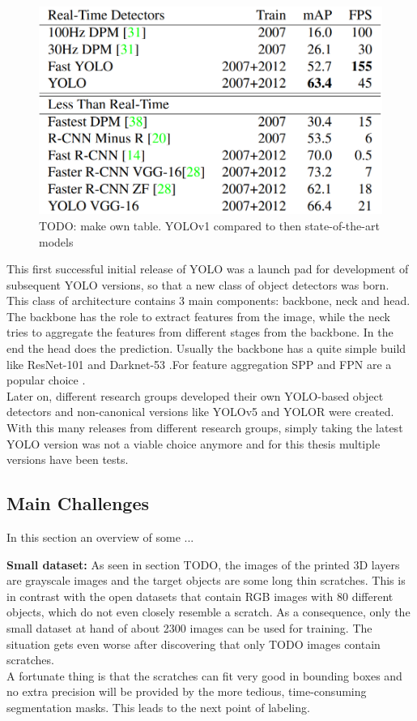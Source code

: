 \begin{figure}[!h]
  \centering
  \includegraphics[width=0.75\linewidth]{images/yolo_images/compare_yolov1}
  \caption{TODO: make own table. YOLOv1 compared to then state-of-the-art models \cite{yolov1_paper}}
\end{figure}


This first successful initial release of YOLO was a launch pad for development of subsequent YOLO versions, so that a new class of object detectors was born. This class of architecture contains 3 main components: backbone, neck and head.
The backbone has the role to extract features from the image, while the neck tries to aggregate the features from different stages from the backbone. In the end the head does the prediction. Usually the backbone has a quite simple build like ResNet-101 and Darknet-53 \cite{yolov3_paper}.For feature aggregation SPP \cite{spp_paper} and FPN \cite{fpn_paper} are a popular choice . \\
Later on, different research groups developed their own YOLO-based object detectors and non-canonical versions like YOLOv5 \cite{yolov5_git} and YOLOR \cite{yolor_paper} were created. With this many releases from different research groups, simply taking the latest YOLO version was not a viable choice anymore and for this thesis multiple versions have been tests.\\

\subsection{Main Challenges} \label{intro:challenges}
In this section an overview of some ...

\textbf{Small dataset:}
As seen in section TODO, the images of the printed 3D layers are grayscale images and the target objects are some long thin scratches. This is in contrast with the open datasets that contain RGB images with 80 different objects, which do not even closely resemble a scratch. As a consequence, only the small dataset at hand of about 2300 images can be used for training. The situation gets even worse after discovering that only TODO images contain scratches. \\
A fortunate thing is that the scratches can fit very good in bounding boxes and no extra precision will be provided by the more tedious, time-consuming segmentation masks. This leads to the next point of labeling. \\


